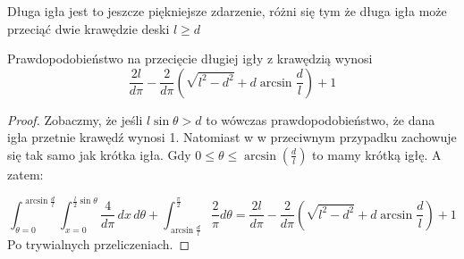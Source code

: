 \begin{definition}
	Długa igła jest to jeszcze piękniejsze zdarzenie, różni się tym że długa igła może przeciąć dwie krawędzie deski \( l \geq d \)
\end{definition}

\begin{theorem}
	Prawdopodobieństwo na przecięcie długiej igły z krawędzią wynosi
	\[
		\frac{2l}{d\pi} - \frac{2}{d\pi}\left(\sqrt{l^2 - d^2} + d\arcsin\frac{d}{l}\right) + 1
	\]
\end{theorem}

\begin{proof}
	Zobaczmy, że jeśli \( l\sin{\theta} > d\) to wówczas prawdopodobieństwo, że dana igła przetnie krawędź wynosi 1. Natomiast w w przeciwnym przypadku zachowuje się tak samo jak krótka igła. Gdy \( 0 \leq \theta \leq \arcsin\left({\frac{d}{l}}\right) \) to mamy krótką igłę. A zatem:

	\[
		\int_{\theta=0}^{\arcsin{\frac{d}{l}}} \int_{x=0}^{\frac{l}{2}\sin{\theta}} \frac{4}{d\pi} \, dx\, d\theta + \int_{\arcsin{\frac{d}{l}}}^{\frac{\pi}{2}} \frac{2}{\pi} d\theta =
		\frac{2l}{d\pi} - \frac{2}{d\pi}\left(\sqrt{l^2 - d^2} + d\arcsin\frac{d}{l}\right) + 1
	\]
	Po trywialnych przeliczeniach.

\end{proof}